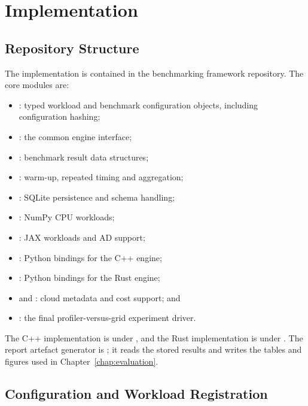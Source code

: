 \chapter{Implementation}
\label{chap:implementation}

\section{Repository Structure}

The implementation is contained in the benchmarking framework repository. The core modules are:
\begin{itemize}
    \item {}: typed workload and benchmark configuration objects, including configuration hashing;
    \item {}: the common engine interface;
    \item {}: benchmark result data structures;
    \item {}: warm-up, repeated timing and aggregation;
    \item {}: SQLite persistence and schema handling;
    \item {}: NumPy CPU workloads;
    \item {}: JAX workloads and AD support;
    \item {}: Python bindings for the C++ engine;
    \item {}: Python bindings for the Rust engine;
    \item {} and : cloud metadata and cost support; and
    \item {}: the final profiler-versus-grid experiment driver.
\end{itemize}

The C++ implementation is under , and the Rust implementation is under . The report artefact generator is ; it reads the stored results and writes the tables and figures used in Chapter~\ref{chap:evaluation}.

\section{Configuration and Workload Registration}

